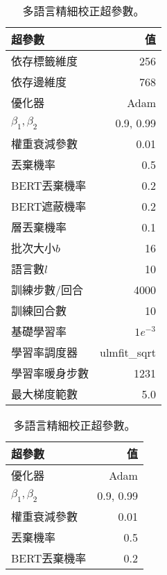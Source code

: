 \begin{table}[htbp]
    \centering
    \begin{subtable}[t]{.4\textwidth}
        \begin{tabular}[t]{@{}lr@{}}
        \toprule
        超參數 & 值 \\
        \midrule
            依存標籤維度         & 256 \\
            依存邊維度           & 768 \\
            優化器              & Adam \\
            $\beta_1,\beta_2$  & 0.9, 0.99 \\
            權重衰減參數         & 0.01 \\
            丟棄機率            & 0.5 \\
            BERT丟棄機率        & 0.2 \\
            BERT遮蔽機率        & 0.2 \\
            層丟棄機率          & 0.1 \\
            批次大小$b$         & 16 \\
            語言數$l$           & 10 \\
            訓練步數/回合        & 4000 \\
            訓練回合數          & 10 \\
            基礎學習率          & $1e^{-3}$ \\
            學習率調度器        & ulmfit\_sqrt \\
            學習率暖身步數       & 1231 \\
            最大梯度範數        & 5.0 \\
        \bottomrule
        \end{tabular}
        \caption{
            多語言精細校正超參數。
        }
        \label{tab:multift_hparams}
    \end{subtable}
    \begin{subtable}[t]{.4\textwidth}
        \begin{tabular}[t]{@{}lr@{}}
        \toprule
        超參數 & 值 \\
        \midrule
            優化器              & Adam \\
            $\beta_1,\beta_2$  & 0.9, 0.99 \\
            權重衰減參數         & 0.01 \\
            丟棄機率            & 0.5 \\
            BERT丟棄機率        & 0.2 \\

\end{tabular}
\end{subtable}
\end{table}
